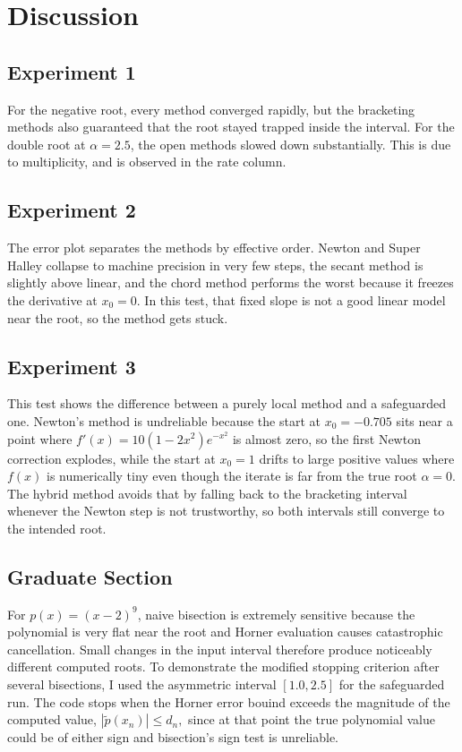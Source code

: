 \documentclass[11pt]{article}
\begin{document}
\clearpage


\section{Discussion}
\subsection*{Experiment 1}
For the negative root, every method converged rapidly, but the bracketing methods 
also guaranteed that the root stayed trapped inside the interval. For the double root at
$\alpha=2.5$, the open methods slowed down substantially. This is due to multiplicity, and is observed in the rate column.

\subsection*{Experiment 2}
The error plot separates the methods by effective order. Newton and Super Halley collapse
to machine precision in very few steps, the secant method is slightly above linear,
and the chord method performs the worst because it freezes the derivative at $x_0=0$. In this
test, that fixed slope is not a good linear model near the root, so the method gets stuck.


\subsection*{Experiment 3}
This test shows the difference between a purely local method and a safeguarded one. Newton's
method is undreliable because the start at $x_0=-0.705$ sits near a point where
$f'(x)=10(1-2x^2)e^{-x^2}$ is almost zero, so the first Newton correction explodes, while the
start at $x_0=1$ drifts to large positive values where $f(x)$ is numerically tiny even though the
iterate is far from the true root $\alpha=0$. The hybrid method avoids that by
falling back to the bracketing interval whenever the Newton step is not trustworthy, so both
intervals still converge to the intended root.

\subsection*{Graduate Section}
For $p(x)=(x-2)^9$, naive bisection is extremely sensitive because the polynomial is very flat near
the root and Horner evaluation causes catastrophic cancellation. 
Small changes in the input interval therefore produce noticeably different computed roots.
To demonstrate the modified stopping criterion after several bisections, I used the asymmetric
interval $[1.0,2.5]$ for the safeguarded run. The code stops when the Horner error bouind exceeds the magnitude of the computed value, $|\tilde p(x_n)| \leq d_n,$ since at that point the true polynomial value could be of either sign and bisection's sign test is unreliable.
\end{document}
